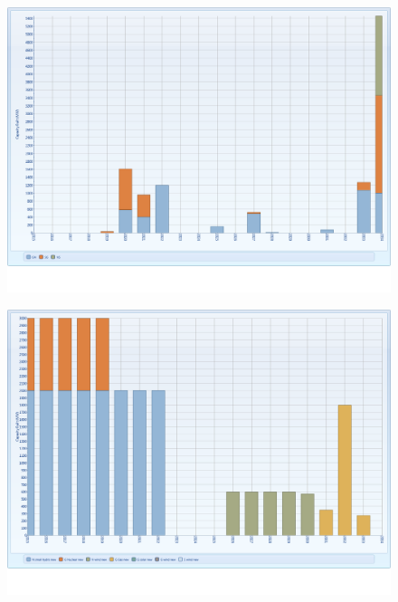 \documentclass{article}
\begin{document}
\begin{figure}[htbp]
\begin{center}
\includegraphics[width=13cm,keepaspectratio=true]{figures/Expansion/EmissionTax/CapacityBuiltInterfaceET}
\caption{}
\label{fig:CapacityBuiltInterfaceET}
\end{center}
\end{figure}
\begin{figure}[htbp]
\begin{center}
\includegraphics[width=13cm,keepaspectratio=true]{figures/Expansion/EmissionTax/CapacityBuiltNewGenET}
\caption{}
\label{fig:CapacityBuiltNewGenET}
\end{center}
\end{figure}
\end{document}
